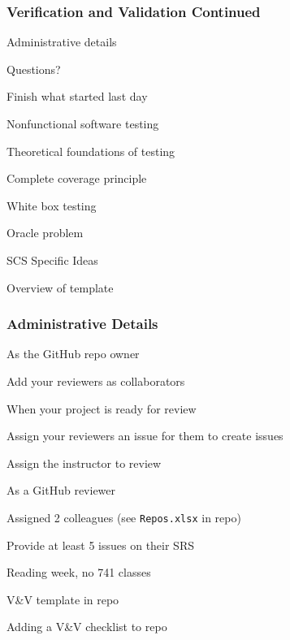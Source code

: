 \documentclass[t,12pt,numbers,fleqn]{beamer}
\begin{document}



\begin{frame}
\frametitle{Verification and Validation Continued}

\bi
\item Administrative details
\item Questions?
\item Finish what started last day
\item Nonfunctional software testing
\item Theoretical foundations of testing
\item Complete coverage principle
\item White box testing
\item Oracle problem
\item SCS Specific Ideas
\item Overview of template
\ei

\end{frame}


\begin{frame}
\frametitle{Administrative Details}

\bi
\item As the GitHub repo owner
\bi
\item Add your reviewers as collaborators
\item When your project is ready for review
\bi
\item Assign your reviewers an issue for
  them to create issues
\item Assign the instructor to review
\ei
\ei
\item As a GitHub reviewer
\bi
\item Assigned 2 colleagues (see \texttt{Repos.xlsx} in repo)
\item Provide at least 5 issues on their SRS
\ei
\item Reading week, no 741 classes
\item V\&V template in repo
\item Adding a V\&V checklist to repo
\ei

\end{frame}

\end{document}
